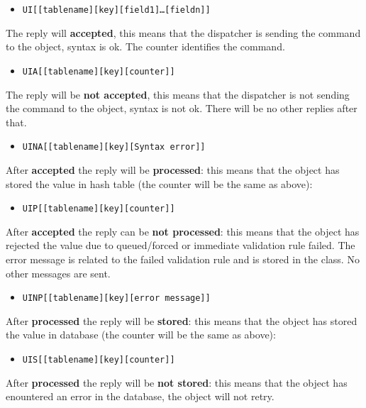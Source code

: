\documentclass[a4paper]{article}
\begin{document}
\begin{itemize}
	\item {\tt UI[[tablename][key][field1]\ldots[fieldn]]}
\end{itemize}


The reply will {\bf accepted}, this means that the dispatcher is sending the
command to the object, syntax is ok. The counter identifies the command.

\begin{itemize}
	\item {\tt UIA[[tablename][key][counter]]}
\end{itemize}

The reply will be {\bf not accepted}, this means that the dispatcher is not
sending the command to the object, syntax is not ok. There will be no other
replies after that.

\begin{itemize}
	\item {\tt UINA[[tablename][key][Syntax error]]}
\end{itemize}


After {\bf accepted} the reply will be {\bf processed}: this means that the
object has stored the value in hash table (the counter will be the same as above):

\begin{itemize}
	\item {\tt UIP[[tablename][key][counter]]}
\end{itemize}

After {\bf accepted} the reply can be {\bf not processed}: this means that the
object has rejected the value due to queued/forced or immediate validation rule
failed. The error message is related to the failed validation rule and is
stored in the class. No other messages are sent. 

\begin{itemize}
	\item {\tt UINP[[tablename][key][error message]]}
\end{itemize}

After {\bf processed} the reply will be {\bf stored}: this means that the
object has stored the value in database (the counter will be the same as above):

\begin{itemize}
	\item {\tt UIS[[tablename][key][counter]]}
\end{itemize}

After {\bf processed} the reply will be {\bf not stored}: this means that the
object has enountered an error in the database, the object will not retry.
\end{document}
